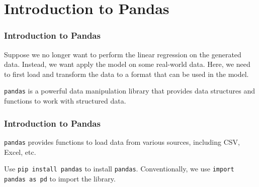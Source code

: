 \documentclass[beamer, en, version=2.0]{huangfusl-template}
\begin{document}
    \section{Introduction to Pandas}
    \begin{frame}[fragile]
        \frametitle{Introduction to Pandas}

        Suppose we no longer want to perform the linear regression on the generated data. Instead, we want apply the model on some real-world data. Here, we need to first load and transform the data to a format that can be used in the model.

        {\color{blue}\footnotesize\verb|pandas|} is a powerful data manipulation library that provides data structures and functions to work with structured data.
    \end{frame}
    \begin{frame}[fragile]
        \frametitle{Introduction to Pandas}

        {\color{blue}\footnotesize\verb|pandas|} provides functions to load data from various sources, including CSV, Excel, etc.

        Use {\color{darkred}\footnotesize\verb|pip install pandas|} to install {\color{blue}\footnotesize\verb|pandas|}. Conventionally, we use {\color{blue}\footnotesize\verb|import pandas as pd|} to import the library.

    \end{frame}
\end{document}
